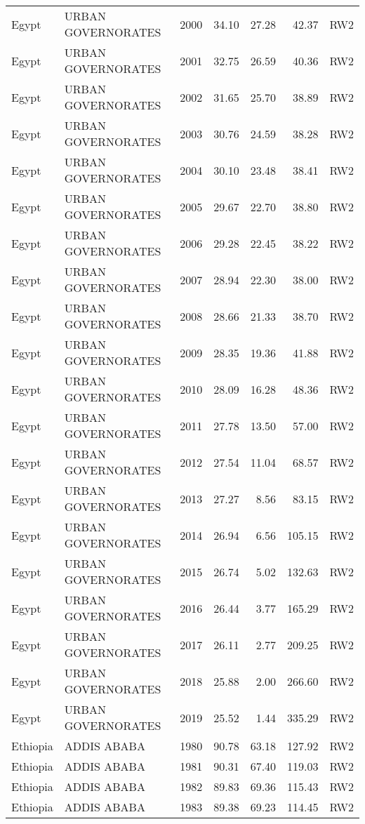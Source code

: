 \begin{longtable}{lllrrrl}
  Egypt & URBAN GOVERNORATES & 2000 & 34.10 & 27.28 & 42.37 & RW2 \\ 
  Egypt & URBAN GOVERNORATES & 2001 & 32.75 & 26.59 & 40.36 & RW2 \\ 
  Egypt & URBAN GOVERNORATES & 2002 & 31.65 & 25.70 & 38.89 & RW2 \\ 
  Egypt & URBAN GOVERNORATES & 2003 & 30.76 & 24.59 & 38.28 & RW2 \\ 
  Egypt & URBAN GOVERNORATES & 2004 & 30.10 & 23.48 & 38.41 & RW2 \\ 
  Egypt & URBAN GOVERNORATES & 2005 & 29.67 & 22.70 & 38.80 & RW2 \\ 
  Egypt & URBAN GOVERNORATES & 2006 & 29.28 & 22.45 & 38.22 & RW2 \\ 
  Egypt & URBAN GOVERNORATES & 2007 & 28.94 & 22.30 & 38.00 & RW2 \\ 
  Egypt & URBAN GOVERNORATES & 2008 & 28.66 & 21.33 & 38.70 & RW2 \\ 
  Egypt & URBAN GOVERNORATES & 2009 & 28.35 & 19.36 & 41.88 & RW2 \\ 
  Egypt & URBAN GOVERNORATES & 2010 & 28.09 & 16.28 & 48.36 & RW2 \\ 
  Egypt & URBAN GOVERNORATES & 2011 & 27.78 & 13.50 & 57.00 & RW2 \\ 
  Egypt & URBAN GOVERNORATES & 2012 & 27.54 & 11.04 & 68.57 & RW2 \\ 
  Egypt & URBAN GOVERNORATES & 2013 & 27.27 & 8.56 & 83.15 & RW2 \\ 
  Egypt & URBAN GOVERNORATES & 2014 & 26.94 & 6.56 & 105.15 & RW2 \\ 
  Egypt & URBAN GOVERNORATES & 2015 & 26.74 & 5.02 & 132.63 & RW2 \\ 
  Egypt & URBAN GOVERNORATES & 2016 & 26.44 & 3.77 & 165.29 & RW2 \\ 
  Egypt & URBAN GOVERNORATES & 2017 & 26.11 & 2.77 & 209.25 & RW2 \\ 
  Egypt & URBAN GOVERNORATES & 2018 & 25.88 & 2.00 & 266.60 & RW2 \\ 
  Egypt & URBAN GOVERNORATES & 2019 & 25.52 & 1.44 & 335.29 & RW2 \\ 
  Ethiopia & ADDIS ABABA & 1980 & 90.78 & 63.18 & 127.92 & RW2 \\ 
  Ethiopia & ADDIS ABABA & 1981 & 90.31 & 67.40 & 119.03 & RW2 \\ 
  Ethiopia & ADDIS ABABA & 1982 & 89.83 & 69.36 & 115.43 & RW2 \\ 
  Ethiopia & ADDIS ABABA & 1983 & 89.38 & 69.23 & 114.45 & RW2 \\ 

\end{longtable}
